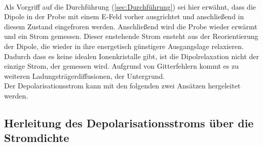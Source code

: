 \\ 
Als Vorgriff auf die Durchführung (\ref{sec:Durchführung}) sei hier erwähnt, dass die Dipole in der Probe
mit einem E-Feld vorher ausgrichtet und anschließend in diesem Zustand eingefroren werden. Anschließend
wird die Probe wieder erwärmt und ein Strom gemessen. Dieser enstehende Strom ensteht aus der Reorientierung
der Dipole, die wieder in ihre energetisch günstigere Ausgangslage relaxieren. Dadurch dass es keine idealen Ionenkristalle
gibt, ist die Dipolrelaxation nicht der einzige Strom, der gemessen wird. Aufgrund von Gitterfehlern kommt es zu weiteren
Ladungsträgerdiffusionen, der Untergrund. \\
Der Depolarisationsstrom kann mit den folgenden zwei Ansätzen hergeleitet werden.

\subsection{Herleitung des Depolarisationsstroms über die Stromdichte}
\label{Subsec:HerStromdichte}
